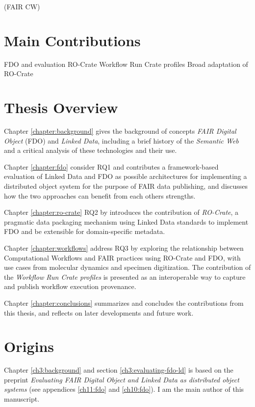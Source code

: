 (FAIR CW)



\section{Main Contributions}

FDO and evaluation
RO-Crate
Workflow Run Crate profiles
Broad adaptation of RO-Crate 



\section{Thesis Overview}

Chapter \vref{chapter:background} gives the background of concepts \emph{FAIR Digital Object} (FDO) and \emph{Linked Data}, including a brief history of the \emph{Semantic Web} and a critical analysis of these technologies and their use. 

Chapter \vref{chapter:fdo} consider RQ1 and contributes a framework-based evaluation of Linked Data and FDO as possible architectures for implementing a distributed object system for the purpose of FAIR data publishing, and discusses how the two approaches can benefit from each others strengths. 

Chapter \vref{chapter:ro-crate} RQ2 by introduces the contribution of \emph{RO-Crate}, a pragmatic data packaging mechanism using Linked Data standards to implement FDO and be extensible for domain-specific metadata.  

Chapter \vref{chapter:workflows} address RQ3 by exploring the relationship between Computational Workflows and FAIR practices using RO-Crate and FDO, with use cases from molecular dynamics and specimen digitization. The contribution of the \emph{Workflow Run Crate profiles} is presented as an interoperable way to capture and publish workflow execution provenance. 

Chapter \vref{chapter:conclusions} summarizes and concludes the contributions from this thesis, and reflects on later developments and future work.


\section{Origins}

Chapter \ref{ch3:background} and section \ref{ch3:evaluating-fdo-ld} is based on the preprint \emph{Evaluating FAIR Digital Object and Linked Data as distributed object systems} \cite{soilandreyes2023c}  (see appendices \vref{ch11:fdo} and \vref{ch10:fdo}). I am the main author of this manuscript.

